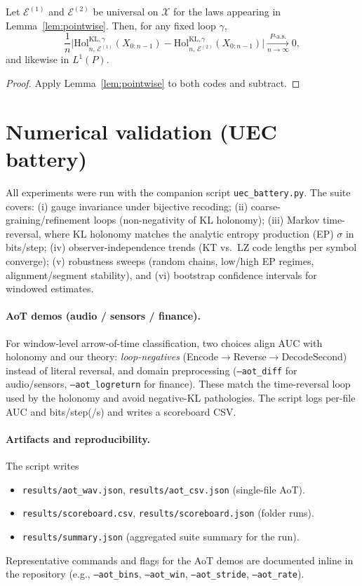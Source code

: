 \documentclass[11pt]{article}
\newcommand{\X}{\mathcal{X}}
\newcommand{\1}{\mathbbm{1}}
\newcommand{\code}{\mathcal{E}}
\begin{document}
\begin{theorem}\label{thm:observer_ind}
Let $\code^{(1)}$ and $\code^{(2)}$ be universal on $\X$ for the laws appearing in Lemma~\ref{lem:pointwise}. Then, for any fixed loop $\gamma$,
\[
\frac{1}{n}\Big|\mathrm{Hol}_{n,\,\code^{(1)}}^{\mathrm{KL},\gamma}(X_{0:n-1}) - \mathrm{Hol}_{n,\,\code^{(2)}}^{\mathrm{KL},\gamma}(X_{0:n-1})\Big| \xrightarrow[n\to\infty]{P\text{-a.s.}} 0,
\]
and likewise in $L^1(P)$.
\end{theorem}
\begin{proof}
Apply Lemma~\ref{lem:pointwise} to both codes and subtract.
\end{proof}

\section{Numerical validation (UEC battery)}

All experiments were run with the companion script \texttt{uec\_battery.py}. The suite covers: (i) gauge invariance under bijective recoding; (ii) coarse-graining/refinement loops (non-negativity of KL holonomy); (iii) Markov time-reversal, where KL holonomy matches the analytic entropy production (EP) $\sigma$ in bits/step; (iv) observer-independence trends (KT vs.\ LZ code lengths per symbol converge); (v) robustness sweeps (random chains, low/high EP regimes, alignment/segment stability), and (vi) bootstrap confidence intervals for windowed estimates.

\paragraph{AoT demos (audio / sensors / finance).} For window-level arrow-of-time classification, two choices align AUC with holonomy and our theory: \emph{loop-negatives}
(Encode$\to$Reverse$\to$DecodeSecond) instead of literal reversal, and domain preprocessing (\texttt{--aot\_diff} for audio/sensors, \texttt{--aot\_logreturn} for finance). These match the time-reversal loop used by the holonomy and avoid negative-KL pathologies. The script logs per-file AUC and bits/step(/s) and writes a scoreboard CSV.

\paragraph{Artifacts and reproducibility.} The script writes
\begin{itemize}[leftmargin=1.25em]
\item \texttt{results/aot\_wav.json}, \texttt{results/aot\_csv.json} (single-file AoT).
\item \texttt{results/scoreboard.csv}, \texttt{results/scoreboard.json} (folder runs).
\item \texttt{results/summary.json} (aggregated suite summary for the run).
\end{itemize}
Representative commands and flags for the AoT demos are documented inline in the repository (e.g., \texttt{--aot\_bins}, \texttt{--aot\_win}, \texttt{--aot\_stride}, \texttt{--aot\_rate}).
\end{document}
